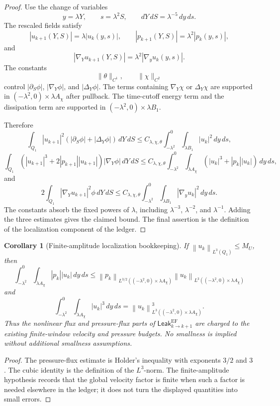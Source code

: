\documentclass[11pt]{article}
\numberwithin{equation}{section}
\theoremstyle{plain}
\newtheorem{corollary}[theorem]{Corollary}
\theoremstyle{definition}
\theoremstyle{remark}
\newcommand{\Leak}{\mathsf{Leak}}
\newcommand{\norm}[1]{\left\lVert #1\right\rVert}
\newcommand{\abs}[1]{\left\lvert #1\right\rvert}
\begin{document}
\begin{proof}
Use the change of variables
\[
  y=\lambda Y,\qquad s=\lambda^2S,\qquad dY\,dS=\lambda^{-5}\,dy\,ds.
\]
The rescaled fields satisfy
\[
  |u_{k+1}(Y,S)|=\lambda |u_k(y,s)|,\qquad
  |p_{k+1}(Y,S)|=\lambda^2 |p_k(y,s)|,
\]
and
\[
  |\nabla_Yu_{k+1}(Y,S)|
  =
  \lambda^2|\nabla_yu_k(y,s)|.
\]
The constants
\[
  \|\theta\|_{C^1},\qquad
  \|\chi\|_{C^2}
\]
control \(\abs{\partial_S\phi}\), \(\abs{\nabla_Y\phi}\), and
\(\abs{\Delta_Y\phi}\).  The terms containing \(\nabla_Y\chi\) or
\(\Delta_Y\chi\) are supported in \((-\lambda^2,0)\times\lambda A_\chi\)
after pullback.  The time-cutoff energy term and the dissipation term are
supported in \((-\lambda^2,0)\times\lambda B_1\).

Therefore
\[
  \int_{Q_1}|u_{k+1}|^2
  \left(\abs{\partial_S\phi}+\abs{\Delta_Y\phi}\right)\,dY\,dS
  \le
  C_{\lambda,\chi,\theta}
  \int_{-\lambda^2}^{0}\int_{\lambda B_1}|u_k|^2\,dy\,ds,
\]
\[
  \int_{Q_1}\left(|u_{k+1}|^3+2|p_{k+1}||u_{k+1}|\right)
  \abs{\nabla_Y\phi}\,dY\,dS
  \le
  C_{\lambda,\chi,\theta}
  \int_{-\lambda^2}^{0}\int_{\lambda A_\chi}
  \left(|u_k|^3+|p_k||u_k|\right)\,dy\,ds,
\]
and
\[
  2\int_{Q_1}|\nabla_Yu_{k+1}|^2\phi\,dY\,dS
  \le
  C_{\lambda,\chi,\theta}
  \int_{-\lambda^2}^{0}\int_{\lambda B_1}|\nabla_yu_k|^2\,dy\,ds.
\]
The constants absorb the fixed powers of \(\lambda\), including
\(\lambda^{-3}\), \(\lambda^{-2}\), and \(\lambda^{-1}\).  Adding the three
estimates gives the claimed bound.  The final assertion is the definition of
the localization component of the ledger.
\end{proof}

\begin{corollary}[Finite-amplitude localization bookkeeping]\label{cor:ef-finite-amplitude}
If \(\norm{u_k}_{L^3(Q_1)}\le M_U\), then
\[
  \int_{-\lambda^2}^{0}\int_{\lambda A_\chi}|p_k||u_k|\,dy\,ds
  \le
  \norm{p_k}_{L^{3/2}((-\lambda^2,0)\times\lambda A_\chi)}
  \norm{u_k}_{L^3((-\lambda^2,0)\times\lambda A_\chi)}
\]
and
\[
  \int_{-\lambda^2}^{0}\int_{\lambda A_\chi}|u_k|^3\,dy\,ds
  =
  \norm{u_k}_{L^3((-\lambda^2,0)\times\lambda A_\chi)}^3 .
\]
Thus the nonlinear flux and pressure-flux parts of
\(\Leak_{k\to k+1}^{\mathrm{EF}}\) are charged to the existing finite-window
velocity and pressure budgets.  No smallness is implied without additional
smallness assumptions.
\end{corollary}

\begin{proof}
The pressure-flux estimate is Holder's inequality with exponents \(3/2\)
and \(3\).  The cubic identity is the definition of the \(L^3\)-norm.  The
finite-amplitude hypothesis records that the global velocity factor is
finite when such a factor is needed elsewhere in the ledger; it does not
turn the displayed quantities into small errors.
\end{proof}
\end{document}
